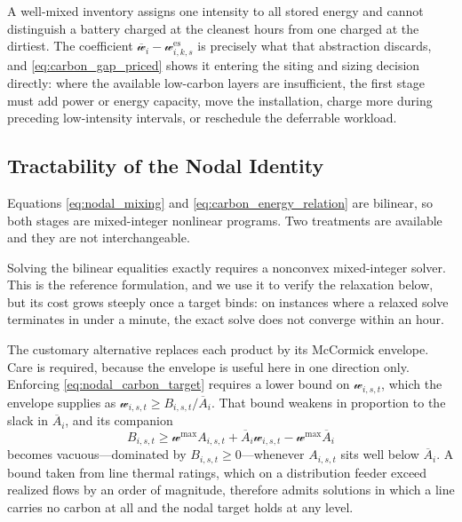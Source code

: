 \documentclass[journal]{IEEEtran}
\begin{document}
A well-mixed inventory assigns one intensity to all stored energy and
cannot distinguish a battery charged at the cleanest hours from one
charged at the dirtiest. The coefficient
$\overline{\mathscr{w}}_i-\mathscr{w}_{i,k,s}^{\mathrm{es}}$ is precisely
what that abstraction discards, and \eqref{eq:carbon_gap_priced} shows it
entering the siting and sizing decision directly: where the available
low-carbon layers are insufficient, the first stage must add power or
energy capacity, move the installation, charge more during preceding
low-intensity intervals, or reschedule the deferrable workload.

\subsection{Tractability of the Nodal Identity}
\label{sec:tractability}

Equations \eqref{eq:nodal_mixing} and \eqref{eq:carbon_energy_relation}
are bilinear, so both stages are mixed-integer nonlinear programs. Two
treatments are available and they are not interchangeable.

Solving the bilinear equalities exactly requires a nonconvex
mixed-integer solver. This is the reference formulation, and we use it to
verify the relaxation below, but its cost grows steeply once a target
binds: on instances where a relaxed solve terminates in under a minute,
the exact solve does not converge within an hour.

The customary alternative replaces each product by its McCormick
envelope. Care is required, because the envelope is useful here in one
direction only. Enforcing \eqref{eq:nodal_carbon_target} requires a lower
bound on $\mathscr{w}_{i,s,t}$, which the envelope supplies as
$\mathscr{w}_{i,s,t}\geq B_{i,s,t}/\overline{A}_i$. That bound weakens in
proportion to the slack in $\overline{A}_i$, and its companion
\begin{equation}
B_{i,s,t}
\geq
\mathscr{w}^{\max}A_{i,s,t}
+\overline{A}_i\mathscr{w}_{i,s,t}
-\mathscr{w}^{\max}\overline{A}_i
\label{eq:mccormick_lower}
\end{equation}
becomes vacuous---dominated by $B_{i,s,t}\geq0$---whenever $A_{i,s,t}$
sits well below $\overline{A}_i$. A bound taken from line thermal
ratings, which on a distribution feeder exceed realized flows by an order
of magnitude, therefore admits solutions in which a line carries no
carbon at all and the nodal target holds at any level.
\end{document}
